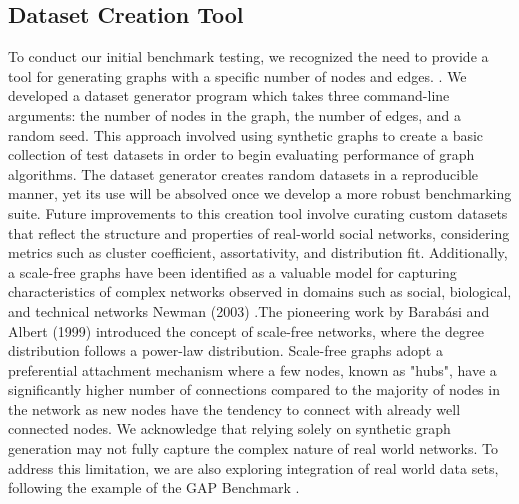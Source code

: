 \documentclass[letterpaper, 10pt]{article}
\begin{document}
\begin{multicols}{2}
{    \section{Dataset Creation Tool}\label{section:datasetCreation}
        To conduct our initial benchmark testing, we recognized the need to provide a tool for generating graphs with a specific number of nodes and edges.
         . We developed a dataset generator program which takes three command-line arguments: the number of nodes in the graph, the number of edges, and a random seed. This approach involved using synthetic graphs to create a basic collection of test datasets in order to begin evaluating performance of graph algorithms.  The dataset generator creates random datasets in a reproducible manner, yet its use will be absolved once we develop a more robust benchmarking suite. Future improvements to this creation tool involve curating custom datasets that reflect the structure and properties of real-world social networks, considering metrics such as cluster coefficient, assortativity, and distribution fit. 
        Additionally, a scale-free graphs have been identified as a valuable model for capturing characteristics of complex networks observed in domains such as social, biological, and technical networks Newman (2003) .The pioneering work by Barabási and Albert (1999)  introduced the concept of scale-free networks, where the degree distribution follows a power-law distribution. Scale-free graphs adopt a preferential attachment mechanism \cite{Rak2020}where a few nodes, known as "hubs", have a significantly higher number of connections compared to the majority of nodes in the network as new nodes have the tendency to connect with already well connected nodes. We acknowledge that relying solely on synthetic graph generation may not fully capture the complex nature of real world networks. To address this limitation, we are also exploring integration of real world data sets, following the example of the GAP Benchmark \cite{Beamer2017}.
        
}
\end{multicols}
\end{document}

